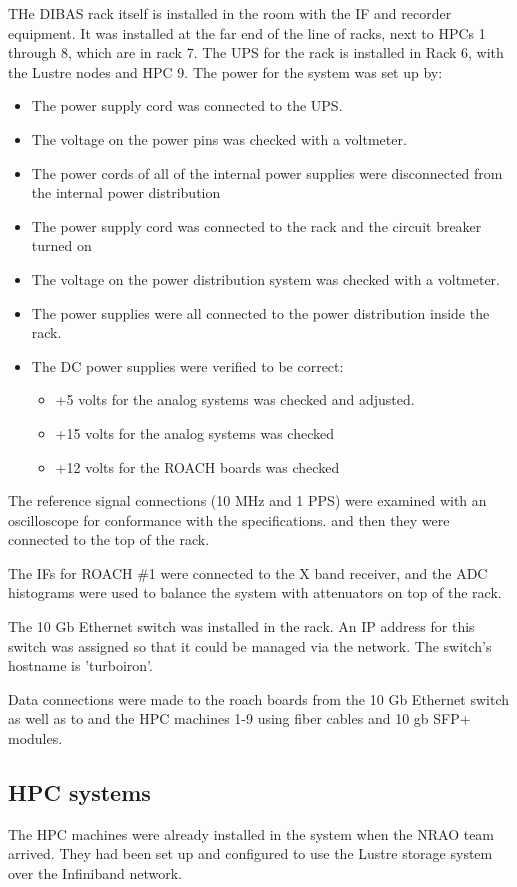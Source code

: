\documentclass[11pt]{article}
\begin{document}
THe DIBAS rack itself is installed in the room with the IF and
recorder equipment.  It was installed at the far end of the line of
racks, next to HPCs 1 through 8, which are in rack 7.  The UPS for the
rack is installed in Rack 6, with the Lustre nodes and HPC 9.  The
power for the system was set up by:
\begin{itemize}
\item The power supply cord was connected to the UPS.
\item The voltage on the power pins was checked with a voltmeter.
\item The power cords of all of the internal power supplies were
  disconnected from the internal power distribution
\item The power supply cord was connected to the rack and the circuit
  breaker turned on
\item The voltage on the power distribution system was checked with a
  voltmeter.
\item The power supplies were all connected to the power distribution
  inside the rack.
\item The DC power supplies were verified to be correct:
\begin{itemize}
\item +5 volts for the analog systems was checked and adjusted.
\item +15 volts for the analog systems was checked
\item +12 volts for the ROACH boards was checked
\end{itemize}
\end{itemize}

The reference signal connections (10 MHz and 1 PPS) were examined with
an oscilloscope for conformance with the specifications. and then they were connected to the top of the rack. 

The IFs for ROACH \#1 were connected to the X band receiver, and the ADC histograms were used to balance the system with attenuators on top of the rack.

The 10 Gb Ethernet switch was installed in the rack.  An IP address for this switch was assigned so that it could be managed via the network.  The switch's hostname is 'turboiron'.

Data connections were made to the roach boards from the 10 Gb Ethernet
switch as well as to and the HPC machines 1-9 using fiber cables and
10 gb SFP+ modules.  

\subsection{HPC systems}
The HPC machines were already installed in the system when the NRAO
team arrived.  They had been set up and configured to use the Lustre
storage system over the Infiniband network.
\end{document}
